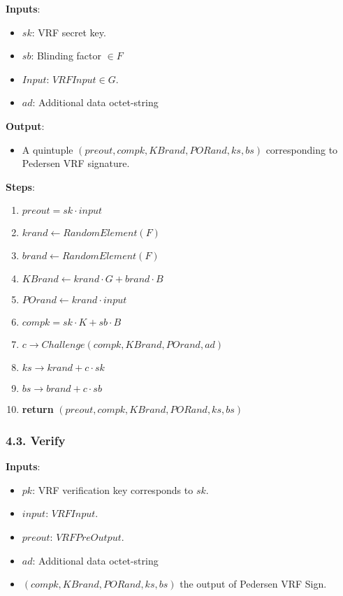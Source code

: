 \documentclass[
]{article}
\providecommand{\tightlist}{%
  \setlength{\itemsep}{0pt}\setlength{\parskip}{0pt}}
\begin{document}
\textbf{Inputs}:

\begin{itemize}
\tightlist
\item
  \(sk\): VRF secret key.
\item
  \(sb\): Blinding factor \(\in F\)
\item
  \(Input\): \(VRFInput \in G\).
\item
  \(ad\): Additional data octet-string
\end{itemize}

\textbf{Output}:

\begin{itemize}
\tightlist
\item
  A quintuple \((preout, compk, KBrand, PORand, ks, bs)\) corresponding
  to Pedersen VRF signature.
\end{itemize}

\textbf{Steps}:

\begin{enumerate}
\def\labelenumi{\arabic{enumi}.}
\tightlist
\item
  \(preout = sk \cdot input\)
\item
  \(krand \leftarrow RandomElement(F)\)
\item
  \(brand \leftarrow RandomElement(F)\)
\item
  \(KBrand \leftarrow krand \cdot G + brand \cdot B\)
\item
  \(POrand \leftarrow krand \cdot input\)
\item
  \(compk = sk \cdot K + sb \cdot B\)
\item
  \(c \rightarrow Challenge(compk, KBrand, POrand, ad)\)
\item
  \(ks \rightarrow krand + c \cdot sk\)
\item
  \(bs \rightarrow brand + c \cdot sb\)
\item
  \textbf{return} \((preout, compk, KBrand, PORand, ks, bs)\)
\end{enumerate}

\hypertarget{verify-1}{%
\subsubsection{4.3. Verify}\label{verify-1}}

\textbf{Inputs}:

\begin{itemize}
\tightlist
\item
  \(pk\): VRF verification key corresponds to \(sk\).
\item
  \(input\): \(VRFInput\).
\item
  \(preout\): \(VRFPreOutput\).
\item
  \(ad\): Additional data octet-string
\item
  \((compk, KBrand, PORand, ks, bs)\) the output of Pedersen VRF Sign.
\end{itemize}
\end{document}

